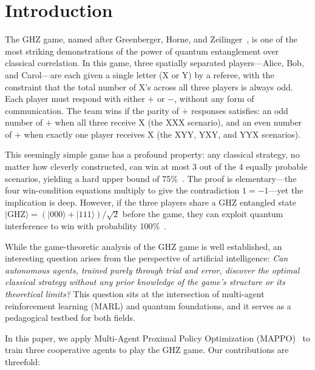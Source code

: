 \documentclass[conference]{IEEEtran}
\begin{document}
\section{Introduction}

The GHZ game, named after Greenberger, Horne, and Zeilinger~\cite{ghz1989}, is one of the most striking demonstrations of the power of quantum entanglement over classical correlation. In this game, three spatially separated players---Alice, Bob, and Carol---are each given a single letter (X or Y) by a referee, with the constraint that the total number of X's across all three players is always odd. Each player must respond with either $+$ or $-$, without any form of communication. The team wins if the parity of $+$ responses satisfies: an odd number of $+$ when all three receive X (the XXX scenario), and an even number of $+$ when exactly one player receives X (the XYY, YXY, and YYX scenarios).

This seemingly simple game has a profound property: any classical strategy, no matter how cleverly constructed, can win at most 3 out of the 4 equally probable scenarios, yielding a hard upper bound of 75\%~\cite{mermin1990}. The proof is elementary---the four win-condition equations multiply to give the contradiction $1 = -1$---yet the implication is deep. However, if the three players share a GHZ entangled state $|\text{GHZ}\rangle = (|000\rangle + |111\rangle)/\sqrt{2}$ before the game, they can exploit quantum interference to win with probability 100\%~\cite{mermin1990extreme,brassard1999}.

While the game-theoretic analysis of the GHZ game is well established, an interesting question arises from the perspective of artificial intelligence: \emph{Can autonomous agents, trained purely through trial and error, discover the optimal classical strategy without any prior knowledge of the game's structure or its theoretical limits?} This question sits at the intersection of multi-agent reinforcement learning (MARL) and quantum foundations, and it serves as a pedagogical testbed for both fields.

In this paper, we apply Multi-Agent Proximal Policy Optimization (MAPPO)~\cite{yu2022mappo} to train three cooperative agents to play the GHZ game. Our contributions are threefold:
\end{document}
